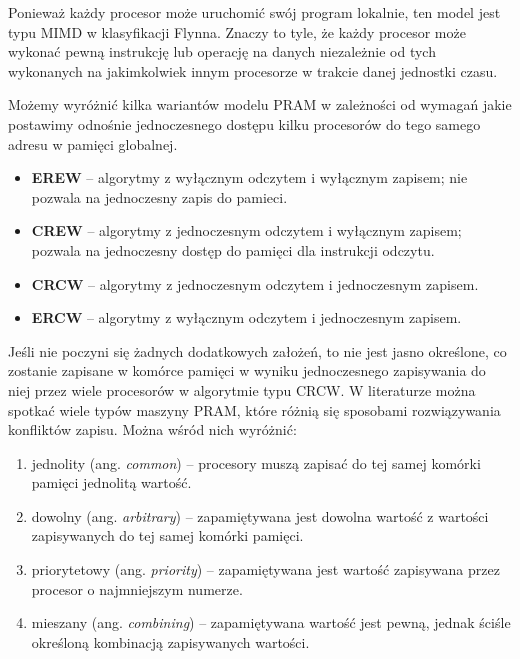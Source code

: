 Ponieważ każdy procesor może uruchomić swój program lokalnie, ten model jest typu MIMD w klasyfikacji Flynna. Znaczy to tyle, że każdy procesor może wykonać pewną instrukcję lub operację na danych niezależnie od tych wykonanych na jakimkolwiek innym procesorze w trakcie danej jednostki czasu.




Możemy wyróżnić kilka wariantów modelu PRAM w zależności od wymagań jakie postawimy odnośnie jednoczesnego dostępu kilku procesorów do tego samego adresu w pamięci globalnej.\\
\begin{itemize}
\item\textbf{EREW} -- algorytmy z wyłącznym odczytem i wyłącznym zapisem; nie pozwala na jednoczesny zapis do pamieci.
\item\textbf{CREW} -- algorytmy z jednoczesnym odczytem i wyłącznym zapisem; pozwala na jednoczesny  dostęp do pamięci dla instrukcji odczytu.
\item\textbf{CRCW} -- algorytmy z jednoczesnym odczytem i jednoczesnym zapisem.
\item\textbf{ERCW} -- algorytmy z wyłącznym odczytem i jednoczesnym zapisem.
\end{itemize}


Jeśli nie poczyni się żadnych dodatkowych założeń, to nie jest jasno określone, co zostanie zapisane w komórce pamięci w wyniku jednoczesnego zapisywania do niej przez wiele procesorów w algorytmie typu CRCW. W literaturze można spotkać wiele typów maszyny PRAM, które różnią się sposobami rozwiązywania konfliktów zapisu. Można wśród nich wyróżnić\cite{Cormen94}:
\begin{enumerate}
\item jednolity (ang. \emph{common}) – procesory muszą zapisać do tej samej komórki pamięci jednolitą wartość.
\item dowolny (ang. \emph{arbitrary}) – zapamiętywana jest dowolna wartość z wartości zapisywanych do tej samej komórki pamięci.
\item priorytetowy (ang. \emph{priority}) – zapamiętywana jest wartość zapisywana przez procesor o najmniejszym numerze.
\item mieszany (ang. \emph{combining}) – zapamiętywana wartość jest pewną, jednak ściśle określoną kombinacją zapisywanych wartości.
\end{enumerate}


